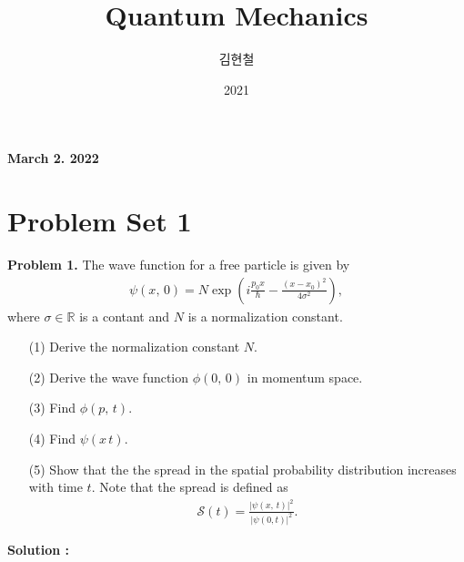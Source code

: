 \documentclass[floatfix,nofootinbib,superscriptaddress,fleqn]{revtex4-2}
\begin{document}
\title{\Large Quantum Mechanics}
\author{김현철}
\date{2021}

\maketitle

 \textbf{\color{red} March 2. 2022} \\ 
\vspace{2cm}

\section*{\large Problem Set 1}
\noindent \textbf{Problem 1.}
The wave function for a free particle is given by
\begin{align*}
\psi(x,\,0) = N \exp\left( i\frac{p_0 x}{\hbar}  
-\frac{(x-x_0)^2}{4\sigma^2} \right),   
\end{align*}
where $\sigma \in \mathbb{R}$ is a contant and $N$ is a normalization
constant. 
\begin{itemize}
\item[(1)] Derive the normalization constant $N$.  
\item[(2)] Derive the wave function $\phi(0,\,0)$ in momentum space. 
\item[(3)] Find $\phi(p,\,t)$.
\item[(4)] Find $\psi(x\,t)$.
\item[(5)] Show that the the spread in the spatial probability
  distribution increases with time $t$. Note that the spread is
  defined as 
  \begin{align*}
\mathcal{S}(t) = \frac{|\psi(x,\,t)|^2}{|\psi(0,t)|^2}.    
  \end{align*}
\end{itemize}
\noindent \textbf{Solution : }
\end{document}
